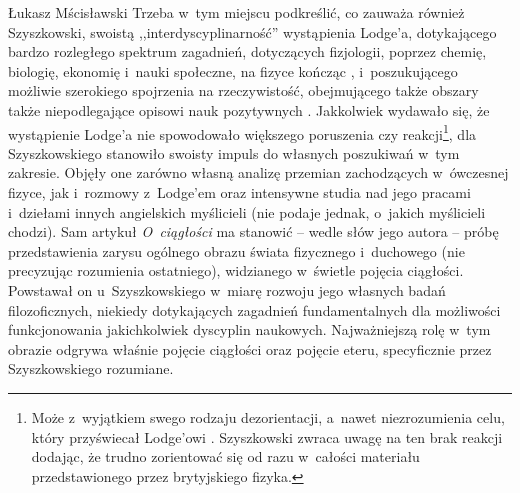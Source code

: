 \begin{artplenv}{Łukasz Mścisławski}
Trzeba w~tym miejscu podkreślić, co zauważa również Szyszkowski, swoistą ,,interdyscyplinarność'' wystąpienia Lodge'a, dotykającego bardzo rozległego spektrum zagadnień, dotyczących fizjologii, poprzez chemię, biologię, ekonomię i~nauki społeczne, na fizyce kończąc
\parencite[][s.~5]{lodge_continuity_1914}, %
 i~poszukującego możliwie szerokiego spojrzenia na rzeczywistość, obejmującego także obszary także niepodlegające opisowi nauk pozytywnych 
\parencite[por.][s.~6]{lodge_continuity_1914}. %
 Jakkolwiek wydawało się, że wystąpienie Lodge'a nie spowodowało większego poruszenia czy reakcji\footnote{Może z~wyjątkiem swego rodzaju dezorientacji, a~nawet niezrozumienia celu, który przyświecał Lodge'owi 
\parencite[por.][s.~45]{szyszkowski_o_1916}. %
 Szyszkowski zwraca uwagę na ten brak reakcji dodając, że trudno zorientować się od razu w~całości materiału przedstawionego przez brytyjskiego fizyka. }, dla Szyszkowskiego stanowiło swoisty impuls do własnych poszukiwań w~tym zakresie. Objęły one zarówno własną analizę przemian zachodzących w~ówczesnej fizyce, jak i~rozmowy z~Lodge'em oraz intensywne studia nad jego pracami i~dziełami innych angielskich myślicieli (nie podaje jednak, o~jakich myślicieli chodzi). Sam artykuł \textit{O~ciągłości} ma stanowić -- wedle słów jego autora -- próbę przedstawienia zarysu ogólnego obrazu świata fizycznego i~duchowego (nie precyzując rozumienia ostatniego), widzianego w~świetle pojęcia ciągłości. Powstawał on u~Szyszkowskiego w~miarę rozwoju jego własnych badań filozoficznych, niekiedy dotykających zagadnień fundamentalnych dla możliwości funkcjonowania jakichkolwiek dyscyplin naukowych. Najważniejszą rolę w~tym obrazie odgrywa właśnie pojęcie ciągłości oraz pojęcie eteru, specyficznie przez Szyszkowskiego rozumiane.


\end{artplenv}
